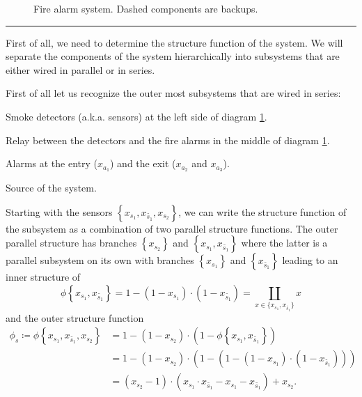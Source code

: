 \begin{figure}[H]
    \centering
    \caption{Fire alarm system. Dashed components are backups.}
    \label{fig:diagram0}
\end{figure}

\hrule
\medskip

First of all, we need to determine the structure function of the system. We will separate the components of the system
hierarchically into subsystems that are either wired in parallel or in series.

First of all let us recognize the outer most subsystems that are wired in series:
\begin{description}[labelwidth=3cm, align=right]
    \item[\(\left\{ x_{s_1}, x_{\tilde{s_1}}, x_{s_2} \right\}\)] Smoke detectors (a.k.a. sensors) at the left side of
        diagram \ref{fig:diagram0}.

    \item[\(\left\{ x_\text{r} \right\}\)] Relay between the detectors and the fire alarms in the middle of
        diagram \ref{fig:diagram0}.

    \item[\(\left\{ x_{a_1}, x_{a_2}, x_{a_3} \right\}\)] Alarms at the entry (\(x_{a_1}\)) and the exit (\(x_{a_2}\)
        and \(x_{a_3}\)).

    \item[\(\left\{ x_\sim \right\}\)] Source of the system.
\end{description}

Starting with the sensors \(\left\{ x_{s_1}, x_{\tilde{s_1}}, x_{s_2} \right\}\), we can write the structure function of
the subsystem as a combination of two parallel structure functions. The outer parallel structure has branches \(\left\{ x_{s_2}
\right\}\) and \(\left\{ x_{s_1}, x_{\tilde{s_1}} \right\}\) where the latter is a parallel subsystem on its own with
branches \(\left\{ x_{s_1} \right\}\) and \(\left\{ x_{\tilde{s_1}} \right\}\) leading to an inner structure of
\[
    \phi\left\{ x_{s_1}, x_{\tilde{s_1}} \right\} = 1 - (1 - x_{s_1})\cdot(1- x_{\tilde{s_1}}) = \coprod_{x \in
    \{ x_{s_1}, x_{\tilde{s_1}} \}} x
\] and the outer structure function \[
\begin{split}
    \phi_s \coloneqq \phi\left\{ x_{s_1}, x_{\tilde{s_1}}, x_{s_2} \right\} &= 1 - (1 - x_{s_2}) \cdot (1 - \phi\left\{ x_{s_1},
    x_{\tilde{s_1}} \right\}) \\ 
                                                           &= 1 - (1 - x_{s_2}) \cdot (1 - (1 - (1 - x_{s_1})\cdot(1- x_{\tilde{s_1}}))) \\
                                                           &= (x_{s_2} - 1) \cdot (x_{s_1}\cdot x_{\tilde{s_1}} - x_{s_1} - x_{\tilde{s_1}}) + x_{s_2}.
\end{split}
\]


